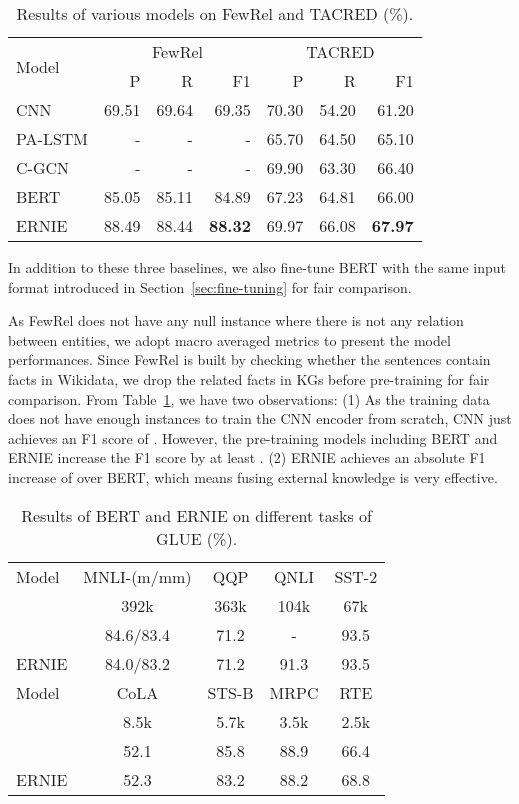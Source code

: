 \documentclass[11pt,a4paper]{article}
\begin{document}
\begin{table}[t]
\scriptsize
\centering
\begin{tabular}{l|rrr|rrr}
  \toprule
  \multirow{2}{*}{Model} & \multicolumn{3}{c|}{FewRel} & \multicolumn{3}{c}{TACRED} \\
  & P & R & F1 & P & R & F1\\
  \midrule
  CNN & 69.51 & 69.64 & 69.35 & 70.30 & 54.20 & 61.20\\ 
  PA-LSTM &- & - & - & 65.70 & 64.50 & 65.10 \\
  C-GCN &- &- &- & 69.90 & 63.30 & 66.40 \\
  BERT & 85.05 & 85.11 & 84.89& 67.23 & 64.81 & 66.00\\ 
  \midrule
  ERNIE & 88.49 & 88.44 & \textbf{88.32}& 69.97 & 66.08 & \textbf{67.97}\\
  \bottomrule
\end{tabular}
\caption{Results of various models on FewRel and TACRED (\%).}
\label{tab-re-res}
\vspace{-3mm}
\end{table}

In addition to these three baselines, we also fine-tune BERT with the same input format introduced in Section~\ref{sec:fine-tuning} for fair comparison.

As FewRel does not have any null instance where there is not any relation between entities, we adopt macro averaged metrics to present the model performances. Since FewRel is built by checking whether the sentences contain facts in Wikidata, we drop the related facts in KGs before pre-training for fair comparison. From Table~\ref{tab-re-res}, we have two observations: (1) As the training data does not have enough instances to train the CNN encoder from scratch, CNN just achieves an F1 score of . However, the pre-training models including BERT and ERNIE increase the F1 score by at least . (2) ERNIE achieves an absolute F1 increase of  over BERT, which means fusing external knowledge is very effective.

\begin{table}[t]
\scriptsize
\centering
\begin{tabular}{l|cccc}
  \toprule
  Model & MNLI-(m/mm) & QQP & QNLI & SST-2 \\
   & 392k & 363k & 104k & 67k\\
  \midrule
   & 84.6/83.4 & 71.2 & - & 93.5 \\
\midrule
  ERNIE & 84.0/83.2 & 71.2 & 91.3 & 93.5 \\
  \midrule
  \midrule
  Model & CoLA & STS-B & MRPC & RTE \\
   &  8.5k & 5.7k & 3.5k & 2.5k \\
  \midrule
   & 52.1 & 85.8 & 88.9 & 66.4 \\
\midrule
  ERNIE & 52.3 & 83.2 & 88.2 & 68.8 \\
  \bottomrule
\end{tabular}
\caption{Results of BERT and ERNIE on different tasks of GLUE (\%).}
\label{tab-glue}
\vspace{-3mm}
\end{table}
\end{document}
